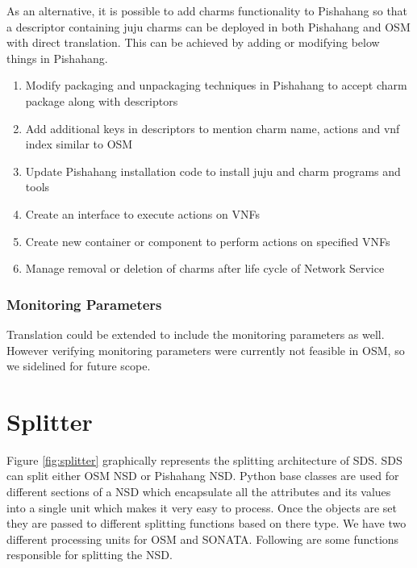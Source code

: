 As an alternative, it is possible to add charms functionality to Pishahang so that a descriptor containing juju charms can be deployed in both Pishahang and OSM with direct translation. This can be achieved by adding or modifying below things in Pishahang.
\begin{enumerate}
	\item Modify packaging and unpackaging techniques in Pishahang to accept charm package along with descriptors
	\item Add additional keys in descriptors to mention charm name, actions and vnf index similar to OSM
	\item Update Pishahang installation code to install juju and charm programs and tools
	\item Create an interface to execute actions on VNFs
	\item Create new container or component to perform actions on specified VNFs
	\item Manage removal or deletion of charms after life cycle of Network Service 
\end{enumerate} 


\subsubsection{Monitoring Parameters}
Translation could be extended to include the monitoring parameters as well. However verifying monitoring parameters were currently not feasible in OSM, so we sidelined for future scope.

\newpage

\section{Splitter}
Figure \ref{fig:splitter} graphically represents the splitting architecture of SDS. SDS can split either OSM NSD or Pishahang NSD. Python base classes are used for different sections of a NSD which encapsulate all the attributes and its values into a single unit which makes it very easy to process. Once the objects are set they are passed to different splitting functions based on there type. We have two different processing units for OSM and SONATA. Following are some functions responsible for splitting the NSD.

